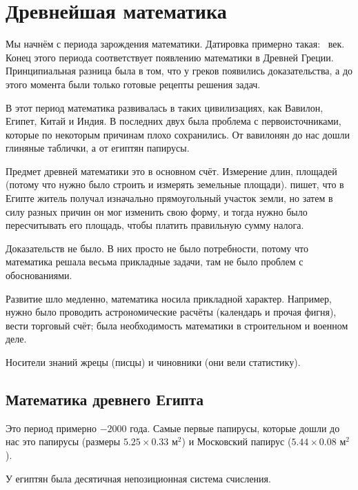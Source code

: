 \documentclass[a4paper,oneside,fleqn,10pt]{article}
\begin{document}


\section{Древнейшая математика}

Мы начнём с периода зарождения математики. Датировка примерно такая:
~век. Конец этого периода соответствует появлению
математики в Древней Греции. Принципиальная разница была в том,
что у греков появились доказательства, а до этого момента были только
готовые рецепты решения задач.

В этот период математика развивалась в таких цивилизациях, как Вавилон, Египет,
Китай и Индия. В последних двух была проблема с первоисточниками,
которые по некоторым причинам плохо сохранились.
От вавилонян до нас дошли глиняные таблички, а от египтян папирусы.

Предмет древней математики это в основном счёт. Измерение длин, площадей (потому что
нужно было строить и измерять земельные площади).  пишет, что в Египте
житель получал изначально прямоугольный участок земли, но затем в силу разных
причин он мог изменить свою форму, и тогда нужно было пересчитывать его площадь,
чтобы платить правильную сумму налога.

Доказательств не было. В них просто не было потребности, потому что
математика решала весьма прикладные задачи, там не было проблем
с обоснованиями.

Развитие шло медленно, математика носила прикладной характер.
Например, нужно было проводить астрономические расчёты (календарь и прочая фигня),
вести торговый счёт; была необходимость математики в строительном и военном деле.

Носители знаний жрецы (писцы) и чиновники (они вели статистику).


\subsection{Математика древнего Египта}

Это период примерно $-2000$ года. Самые первые папирусы,
которые дошли до нас это папирусы  (размеры $5.25 \times 0.33$ м$^2$)
и Московский папирус ($5.44 \times 0.08$ м$^2$).

У египтян была десятичная непозиционная система счисления.
\end{document}
